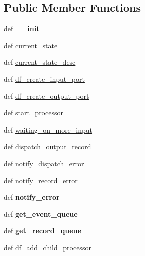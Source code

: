 \subsection*{Public Member Functions}
\begin{DoxyCompactItemize}
\item 
\hypertarget{classetl_1_1EtlProcessorBase_1_1EtlProcessorBase_a5f5cbe4f638a7960a9d2acb9d8d41c4d}{def {\bfseries \-\_\-\-\_\-init\-\_\-\-\_\-}}\label{classetl_1_1EtlProcessorBase_1_1EtlProcessorBase_a5f5cbe4f638a7960a9d2acb9d8d41c4d}

\item 
def \hyperlink{classetl_1_1EtlProcessorBase_1_1EtlProcessorBase_ae0946b935a1d48c58791d3093401dc3b}{current\-\_\-state}
\item 
def \hyperlink{classetl_1_1EtlProcessorBase_1_1EtlProcessorBase_aae68b2482869b7ef16ba7060eb697f0a}{current\-\_\-state\-\_\-desc}
\item 
def \hyperlink{classetl_1_1EtlProcessorBase_1_1EtlProcessorBase_a9f07bf2c83f0d88aa18e6cf14307c1d7}{df\-\_\-create\-\_\-input\-\_\-port}
\item 
def \hyperlink{classetl_1_1EtlProcessorBase_1_1EtlProcessorBase_aa381c6d1c2a46d944bf6e38f35c1bd09}{df\-\_\-create\-\_\-output\-\_\-port}
\item 
def \hyperlink{classetl_1_1EtlProcessorBase_1_1EtlProcessorBase_a9c6d70b1b3cc1a4e4e16f99c66ef16f5}{start\-\_\-processor}
\item 
def \hyperlink{classetl_1_1EtlProcessorBase_1_1EtlProcessorBase_af76118658743124b1ec374c8b9efb3ef}{waiting\-\_\-on\-\_\-more\-\_\-input}
\item 
def \hyperlink{classetl_1_1EtlProcessorBase_1_1EtlProcessorBase_aa1514472c9ed48feae21629a7afa19b4}{dispatch\-\_\-output\-\_\-record}
\item 
def \hyperlink{classetl_1_1EtlProcessorBase_1_1EtlProcessorBase_a016207be9c5cfa047a3e50355fa1d7f3}{notify\-\_\-dispatch\-\_\-error}
\item 
def \hyperlink{classetl_1_1EtlProcessorBase_1_1EtlProcessorBase_ac63c59ee7858b2d7f8d8c57a82469e39}{notify\-\_\-record\-\_\-error}
\item 
\hypertarget{classetl_1_1EtlProcessorBase_1_1EtlProcessorBase_a232eb2642f9da1d49ebe7aaf8bc244c5}{def {\bfseries notify\-\_\-error}}\label{classetl_1_1EtlProcessorBase_1_1EtlProcessorBase_a232eb2642f9da1d49ebe7aaf8bc244c5}

\item 
\hypertarget{classetl_1_1EtlProcessorBase_1_1EtlProcessorBase_ae7bc56cdbd7fb9d02259ba34602378f2}{def {\bfseries get\-\_\-event\-\_\-queue}}\label{classetl_1_1EtlProcessorBase_1_1EtlProcessorBase_ae7bc56cdbd7fb9d02259ba34602378f2}

\item 
\hypertarget{classetl_1_1EtlProcessorBase_1_1EtlProcessorBase_ab9341af5f174eecff55b1ac1be7c8246}{def {\bfseries get\-\_\-record\-\_\-queue}}\label{classetl_1_1EtlProcessorBase_1_1EtlProcessorBase_ab9341af5f174eecff55b1ac1be7c8246}

\item 
def \hyperlink{classetl_1_1EtlProcessorBase_1_1EtlProcessorBase_ad9b0b04dcac7b59d8cbe00c3f36a0ce9}{df\-\_\-add\-\_\-child\-\_\-processor}
\end{DoxyCompactItemize}
